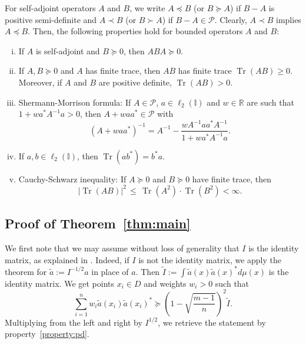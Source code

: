 \documentclass[a4paper,11pt]{article}
\renewcommand{\(}{\left (}
\renewcommand{\)}{\right )}
\newcommand{\<}{\langle}
\renewcommand{\>}{\rangle}
\newcommand{\R}{\mathbb{R}}
\newcommand{\II}{\mathbb{I}}
\theoremstyle{definition}
\DeclareMathOperator{\Tr}{Tr}
\begin{document}
For self-adjoint operators $A$ and $B$, we write $A\preccurlyeq B$ (or $B\succcurlyeq A$) if $B-A$ is positive semi-definite
and $A\prec B$ (or $B\succ A$) if $B-A\in \mathcal P$. Clearly, $A\prec B$ implies $A\preccurlyeq B$.
Then, the following properties hold for bounded operators $A$ and $B$:
\begin{enumerate}[(i)]
    \item \label{property:pd} If $A$ is self-adjoint and $B\succcurlyeq 0$, then $ABA\succcurlyeq 0$.
    \item\label{property:trace-positive} If $A,B\succcurlyeq 0$ and $A$ has finite trace, then $AB$ has finite trace $\Tr(AB) \ge 0$.\\
    Moreover, if $A$ and $B$ are positive definite, $\Tr(AB)> 0$.
    \item  \label{property:SM} Shermann-Morrison formula: 
    If $A\in \mathcal P$, $a\in \ell_2(\mathbb I)$ and $w\in\R$ are such that $1+wa^*A^{-1}a > 0$,
    then $A+waa^*\in \mathcal P$ with
    \[
     (A+waa^*)^{-1} = A^{-1} - \frac{wA^{-1}aa^*A^{-1}}{1+wa^*A^{-1}a}.
    \]
\item\label{property:circ}
    If $a,b\in \ell_2(\II)$, then $\Tr(ab^*)=b^*a$.
    \item\label{property:CS} Cauchy-Schwarz inequality: If $A\succcurlyeq 0$ and $B\succcurlyeq 0$ have finite trace, then
    \[
    |\Tr(AB)|^2 \,\leq\, \Tr(A^2) \cdot \Tr(B^2)<\infty.
    \]
\end{enumerate}




\subsection{Proof of Theorem~\ref{thm:main}}
\label{sec:main-proof}

We first note that we may assume without loss of generality 
that $I$ is the identity matrix, as explained in \cite[Proof of Theorem~1.2]{BSS}.
Indeed, if $I$ is not the identity matrix,
we apply the theorem for $\tilde a := I^{-1/2} a $ in place of $a$.
Then $\widetilde I := \int \tilde a(x) \tilde a(x)^* d\mu(x)$ is the identity matrix.
We get points $x_i \in D$ and weights $w_i>0$ such that
\[
\sum_{i=1}^n w_i\tilde a(x_i) \tilde a(x_i)^*
\succcurlyeq
\left(1-\sqrt{\frac{m-1}{n}}\right)^2 \widetilde I.
\]
Multiplying from the left and right by $I^{1/2}$, 
we retrieve the statement by property~\eqref{property:pd}.
\end{document}
